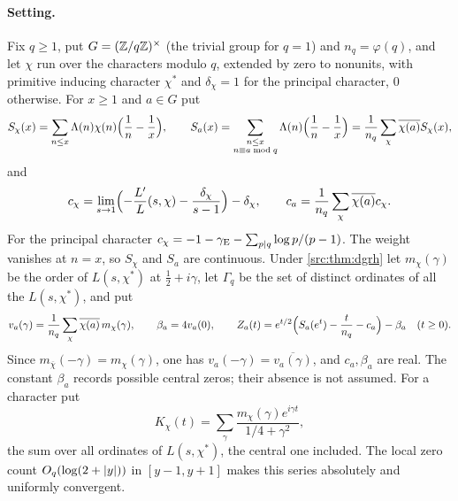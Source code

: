 \paragraph{Setting.}
Fix $q\ge1$, put $G=(\mathbb{Z}/q\mathbb{Z})^\times$ (the trivial group for $q=1$) and $n_q=\varphi(q)$, and let
$\chi$ run over the characters modulo $q$, extended by zero to nonunits, with primitive
inducing character $\chi^*$ and $\delta_\chi=1$ for the principal character, $0$ otherwise. For
$x\ge1$ and $a\in G$ put
\[
 S_\chi(x)=\sum_{n\le x}\Lambda(n)\chi(n)\Bigl(\frac1n-\frac1x\Bigr),\qquad
 S_a(x)=\sum_{\substack{n\le x\\n\equiv a\bmod q}}\Lambda(n)\Bigl(\frac1n-\frac1x\Bigr)
 =\frac1{n_q}\sum_\chi\overline{\chi(a)}S_\chi(x),
\]
and
\[
 c_\chi=\lim_{s\to1}\Bigl(-\frac{L'}{L}(s,\chi)-\frac{\delta_\chi}{s-1}\Bigr)-\delta_\chi,\qquad
 c_a=\frac1{n_q}\sum_\chi\overline{\chi(a)}c_\chi .
\]
For the principal character $c_\chi=-1-\gamma_{\mathrm{E}}-\sum_{p\mid q}\log p/(p-1)$. The weight vanishes at
$n=x$, so $S_\chi$ and $S_a$ are continuous. Under \cref{src:thm:dgrh} let $m_\chi(\gamma)$ be the
order of $L(s,\chi^*)$ at $\tfrac12+i\gamma$, let $\Gamma_q$ be the set of distinct ordinates of
all the $L(s,\chi^*)$, and put
\begin{equation}\label{zer:eq:va}
 v_a(\gamma)=\frac1{n_q}\sum_\chi\overline{\chi(a)}\,m_\chi(\gamma),\qquad
 \beta_a=4v_a(0),\qquad
 Z_a(t)=e^{t/2}\Bigl(S_a(e^t)-\frac t{n_q}-c_a\Bigr)-\beta_a\quad(t\ge0).
\end{equation}
Since $m_{\overline\chi}(-\gamma)=m_\chi(\gamma)$, one has $v_a(-\gamma)=\overline{v_a(\gamma)}$, and
$c_a,\beta_a$ are real. The constant $\beta_a$ records possible central zeros; their absence is
not assumed. For a character put
\[
 K_\chi(t)=\sum_{\gamma}\frac{m_\chi(\gamma)e^{i\gamma t}}{1/4+\gamma^2},
\]
the sum over all ordinates of $L(s,\chi^*)$, the central one included. The local zero count
$O_q(\log(2+\lvert y\rvert))$ in $[y-1,y+1]$ makes this series absolutely and uniformly convergent.

